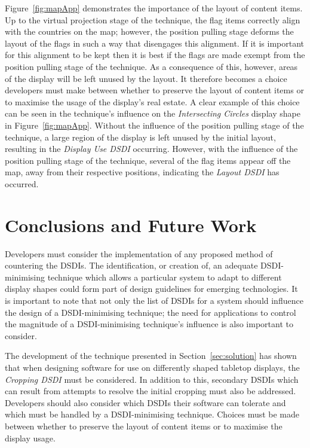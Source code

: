 \documentclass[twocolumn,compsoc]{cvm}
\begin{document}
{Figure~\ref{fig:mapApp} demonstrates the importance of the layout of content items.
Up to the virtual projection stage of the technique, the flag items correctly align with the countries on the map; however, the position pulling stage deforms the layout of the flags in such a way that disengages this alignment.
If it is important for this alignment to be kept then it is best if the flags are made exempt from the position pulling stage of the technique.
As a consequence of this, however, areas of the display will be left unused by the layout.
It therefore becomes a choice developers must make between whether to preserve the layout of content items or to maximise the usage of the display's real estate.
A clear example of this choice can be seen in the technique's influence on the {\emph{Intersecting Circles}} display shape in Figure~\ref{fig:mapApp}.
Without the influence of the position pulling stage of the technique, a large region of the display is left unused by the initial layout, resulting in the {\emph{Display Use \ac{DSDI}}} occurring.
However, with the influence of the position pulling stage of the technique, several of the flag items appear off the map, away from their respective positions, indicating the {\emph{Layout \ac{DSDI}}} has occurred.


\section{Conclusions and Future Work}
\label{sec:conclusion}

Developers must consider the implementation of any proposed method of countering the \acp{DSDI}.
The identification, or creation of, an adequate \ac{DSDI}-minimising technique which allows a particular system to adapt to different display shapes could form part of design guidelines for emerging technologies.
It is important to note that not only the list of \acp{DSDI} for a system should influence the design of a \ac{DSDI}-minimising technique; the need for applications to control the magnitude of a \ac{DSDI}-minimising technique's influence is also important to consider.

The development of the technique presented in Section~\ref{sec:solution} has shown that when designing software for use on differently shaped tabletop displays, the {\emph{Cropping \ac{DSDI}}} must be considered.
In addition to this, secondary \acp{DSDI} which can result from attempts to resolve the initial cropping must also be addressed.
Developers should also consider which \acp{DSDI} their software can tolerate and which must be handled by a \ac{DSDI}-minimising technique.
Choices must be made between whether to preserve the layout of content items or to maximise the display usage.

}
\end{document}
